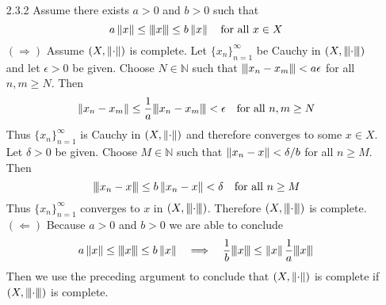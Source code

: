 \documentclass[../../Solutions.tex]{subfiles}
\begin{document}
\begin{itemize}
	\item [2.3.2] Assume there exists $a > 0$ and $b > 0$ such that
		$$ a\norm{x} \leq \inorm{x} \leq b\norm{x} \quad \text{for all } x \in X $$
		$(\Rightarrow)$ Assume $(X,\norm{\cdot})$ is complete.
		Let $\{x_n\}_{n=1}^\infty$ be Cauchy in $(X,\inorm{\cdot})$ and let $\epsilon > 0$ be given.
		Choose $N \in \mathbb{N}$ such that $\inorm{x_n - x_m} < a\epsilon$ for all $n,m \geq N$.
		Then
		$$ \norm{x_n - x_m} \leq \frac{1}{a}\inorm{x_n - x_m} < \epsilon  \quad \text{for all } n,m \geq N $$
		Thus $\{x_n\}_{n=1}^\infty$ is Cauchy in $(X,\norm{\cdot})$ and therefore converges to some $x \in X$.
		Let $\delta > 0$ be given.
		Choose $M \in \mathbb{N}$ such that $\norm{x_n - x} < \delta/b$ for all $n \geq M$.
		Then
		$$ \inorm{x_n - x} \leq b\norm{x_n - x} < \delta \quad \text{for all } n \geq M $$
		Thus $\{x_n\}_{n=1}^\infty$ converges to $x$ in $(X,\inorm{\cdot})$.
		Therefore $(X,\inorm{\cdot})$ is complete. \\
		$(\Leftarrow)$ Because $a > 0$ and $b > 0$ we are able to conclude
		$$ a\norm{x} \leq \inorm{x} \leq b\norm{x} \quad\Longrightarrow\quad \frac{1}{b}\inorm{x} \leq \norm{x} \frac{1}{a}\inorm{x} $$
		Then we use the preceding argument to conclude that $(X,\norm{\cdot})$ is complete if $(X,\inorm{\cdot})$ is complete.
	

\end{itemize}
\end{document}
